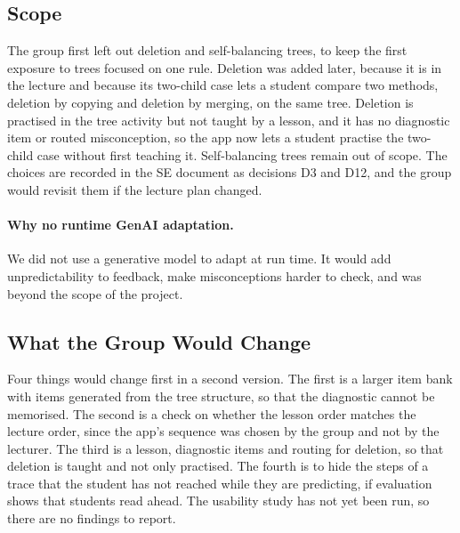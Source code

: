 \subsection{Scope}
The group first left out deletion and self-balancing trees, to keep the first exposure to trees focused on one rule. Deletion was added later, because it is in the lecture and because its two-child case lets a student compare two methods, deletion by copying and deletion by merging, on the same tree. Deletion is practised in the tree activity but not taught by a lesson, and it has no diagnostic item or routed misconception, so the app now lets a student practise the two-child case without first teaching it. Self-balancing trees remain out of scope. The choices are recorded in the SE document as decisions D3 and D12, and the group would revisit them if the lecture plan changed.

\paragraph{Why no runtime GenAI adaptation.} We did not use a generative model to adapt at run time. It would add unpredictability to feedback, make misconceptions harder to check, and was beyond the scope of the project.

\subsection{What the Group Would Change}
Four things would change first in a second version. The first is a larger item bank with items generated from the tree structure, so that the diagnostic cannot be memorised. The second is a check on whether the lesson order matches the lecture order, since the app's sequence was chosen by the group and not by the lecturer. The third is a lesson, diagnostic items and routing for deletion, so that deletion is taught and not only practised. The fourth is to hide the steps of a trace that the student has not reached while they are predicting, if evaluation shows that students read ahead. The usability study has not yet been run, so there are no findings to report.